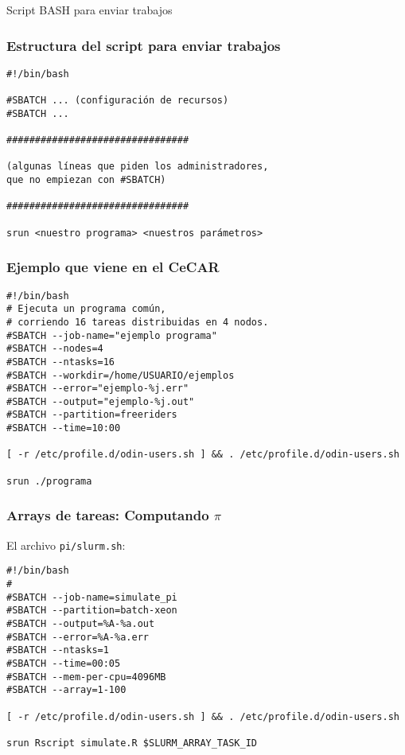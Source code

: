 \documentclass[handout]{beamer}
\begin{document}
\begin{frame}
\begin{center}
\huge{Script BASH para enviar trabajos}
\end{center}
\end{frame}


\begin{frame}[fragile]
\frametitle{Estructura del script para enviar trabajos}
\begin{verbatim}
#!/bin/bash

#SBATCH ... (configuración de recursos)
#SBATCH ...

################################

(algunas líneas que piden los administradores,
que no empiezan con #SBATCH)

################################

srun <nuestro programa> <nuestros parámetros>
\end{verbatim}
\end{frame}

\begin{frame}[fragile]
\frametitle{Ejemplo que viene en el CeCAR}
\begin{verbatim}
#!/bin/bash
# Ejecuta un programa común, 
# corriendo 16 tareas distribuidas en 4 nodos.
#SBATCH --job-name="ejemplo programa"
#SBATCH --nodes=4
#SBATCH --ntasks=16
#SBATCH --workdir=/home/USUARIO/ejemplos
#SBATCH --error="ejemplo-%j.err"
#SBATCH --output="ejemplo-%j.out"
#SBATCH --partition=freeriders
#SBATCH --time=10:00

[ -r /etc/profile.d/odin-users.sh ] && . /etc/profile.d/odin-users.sh

srun ./programa
\end{verbatim}
\end{frame}


\begin{frame}[fragile]
\frametitle{Arrays de tareas: Computando $\pi$}
El archivo \Verb=pi/slurm.sh=:
\begin{verbatim}
#!/bin/bash
#
#SBATCH --job-name=simulate_pi
#SBATCH --partition=batch-xeon
#SBATCH --output=%A-%a.out
#SBATCH --error=%A-%a.err
#SBATCH --ntasks=1
#SBATCH --time=00:05
#SBATCH --mem-per-cpu=4096MB
#SBATCH --array=1-100

[ -r /etc/profile.d/odin-users.sh ] && . /etc/profile.d/odin-users.sh

srun Rscript simulate.R $SLURM_ARRAY_TASK_ID
\end{verbatim}
\end{frame}
\end{document}
